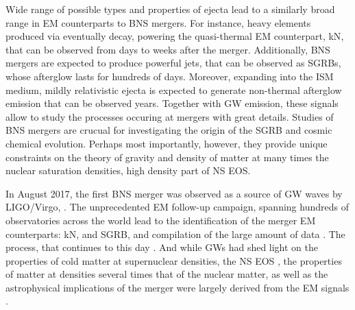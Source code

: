 Wide range of possible types and properties of ejecta lead to a similarly broad 
range in \ac{EM} counterparts to \ac{BNS} mergers. For instance, heavy elements 
produced via \rproc{} \nuc{} eventually decay, powering the quasi-thermal \ac{EM} 
counterpart, \ac{kN}, that can be observed from days to weeks after the merger. 
Additionally, \ac{BNS} mergers are expected to produce 
powerful jets, that can be observed as \acp{SGRB}, whose afterglow lasts for hundreds of days. 
Moreover, expanding into the \ac{ISM} 
medium, mildly relativistic ejecta is expected to generate non-thermal afterglow emission
that can be observed years. 
Together with \ac{GW} emission, these signals allow to study the processes occuring 
at mergers with great details. Studies of \ac{BNS} mergers are crucual for 
investigating the origin of the \ac{SGRB} and cosmic chemical evolution. 
Perhaps most importantly, however, they provide unique constraints on the 
theory of gravity and density of matter at many times the nuclear saturation densities, 
high density part of \ac{NS} \ac{EOS}. 



In August 2017, the first \ac{BNS} merger was observed 
as a source of \ac{GW} waves by \ac{LIGO}/Virgo, \GW{}. The unprecedented \ac{EM} 
follow-up campaign, spanning hundreds of observatories across the world lead to 
the identification of the merger \ac{EM} counterparts: \ac{kN}, \AT{} and 
\ac{SGRB}, \GRB{} and compilation of the large amount of data
\citep{TheLIGOScientific:2017qsa,Abbott:2018wiz,GBM:2017lvd}. 
The process, that continues to this day \citep{Hajela:2021faz}.
%
And while \acp{GW} had shed light on the properties of cold matter 
at supernuclear densities, the \ac{NS} \ac{EOS} 
\citep{Hinderer:2009ca,Damour:2012yf,DelPozzo:2013ala}, 
the properties of matter at densities several times that of the 
nuclear matter, as well as the astrophysical implications of the merger 
were largely derived from the \ac{EM} signals 
\citep{Villar:2017wcc,Hajela:2019mjy,Radice:2018ozg,LIGOScientific:2017ync}.

